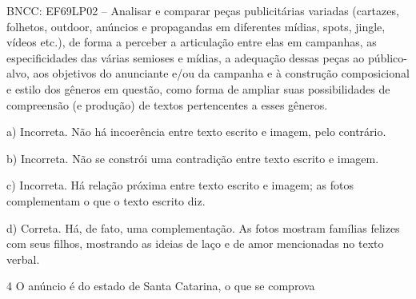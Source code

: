 \begin{itemize}
\begin{itemize}
\begin{escolha}
\begin{escolha}
\begin{escolha}
BNCC: EF69LP02 -- Analisar e comparar peças publicitárias variadas
(cartazes, folhetos, outdoor, anúncios e propagandas em diferentes
mídias, spots, jingle, vídeos etc.), de forma a perceber a articulação
entre elas em campanhas, as especificidades das várias semioses e
mídias, a adequação dessas peças ao público-alvo, aos objetivos do
anunciante e/ou da campanha e à construção composicional e estilo dos
gêneros em questão, como forma de ampliar suas possibilidades de
compreensão (e produção) de textos pertencentes a esses gêneros.

a) Incorreta. Não há incoerência entre texto escrito e imagem, pelo
contrário.

b) Incorreta. Não se constrói uma contradição entre texto escrito e
imagem.

c) Incorreta. Há relação próxima entre texto escrito e imagem; as fotos
complementam o que o texto escrito diz.

d) Correta. Há, de fato, uma complementação. As fotos mostram famílias
felizes com seus filhos, mostrando as ideias de laço e de amor
mencionadas no texto verbal.

\num{4} O anúncio é do estado de Santa Catarina, o que se comprova

\end{escolha}
\end{escolha}
\end{escolha}
\end{itemize}
\end{itemize}
